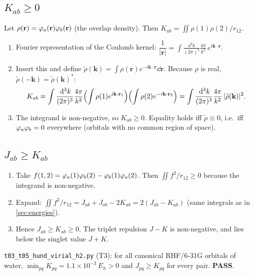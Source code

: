 \subsection{$K_{ab}\ge0$}
Let $\rho(\mathbf r)=\varphi_a(\mathbf r)\varphi_b(\mathbf r)$ (the overlap density). Then $K_{ab}=\iint\rho(1)\rho(2)/r_{12}$.
\begin{enumerate}
  \item Fourier representation of the Coulomb kernel: $\dfrac1{|\mathbf r|}=\displaystyle\int\frac{\dd^3k}{(2\pi)^3}\frac{4\pi}{k^2}\,e^{i\mathbf k\cdot\mathbf r}$.
  \item Insert this and define $\tilde\rho(\mathbf k)=\int\rho(\mathbf r)e^{-i\mathbf k\cdot\mathbf r}\dd\mathbf r$.
        Because $\rho$ is real, $\tilde\rho(-\mathbf k)=\tilde\rho(\mathbf k)^*$:
        \[
          K_{ab}=\int\frac{\,\mathrm d^3k}{(2\pi)^3}\frac{4\pi}{k^2}\Bigl(\int\rho(1)e^{i\mathbf k\cdot\mathbf r_1}\Bigr)
          \Bigl(\int\rho(2)e^{-i\mathbf k\cdot\mathbf r_2}\Bigr)
          =\int\frac{\,\mathrm d^3k}{(2\pi)^3}\frac{4\pi}{k^2}\,|\tilde\rho(\mathbf k)|^2 .
        \]
  \item The integrand is non-negative, so $K_{ab}\ge0$. Equality holds iff $\tilde\rho\equiv0$, i.e.\
        iff $\varphi_a\varphi_b=0$ everywhere (orbitals with no common region of space).
\end{enumerate}

\subsection{$J_{ab}\ge K_{ab}$}
\begin{enumerate}
  \item Take $f(1,2)=\varphi_a(1)\varphi_b(2)-\varphi_b(1)\varphi_a(2)$. Then $\iint f^2/r_{12}\ge0$ because the integrand is non-negative.
  \item Expand: $\iint f^2/r_{12}=J_{ab}+J_{ab}-2K_{ab}=2(J_{ab}-K_{ab})$ (same integrals as in \cref{sec:energies}).
  \item Hence $J_{ab}\ge K_{ab}\ge0$. The triplet repulsion $J-K$ is non-negative, and lies below the
        singlet value $J+K$.
\end{enumerate}
\begin{verifybox}
\texttt{t03\_t05\_hund\_virial\_h2.py} (T3): for all canonical RHF/6-31G orbitals of water,
$\min_{pq}K_{pq}=1.1\times10^{-3}\,E_h>0$ and $J_{pq}\ge K_{pq}$ for every pair. \textbf{PASS}.
\end{verifybox}
